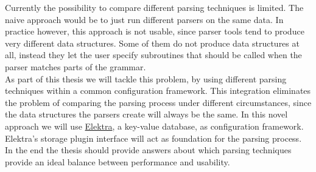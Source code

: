 \documentclass[draft, oneside, final]{vutinfth}
\begin{document}
Currently the possibility to compare different parsing techniques is limited. The naive approach would be to just run different parsers on the same data. In practice however, this approach is not usable, since parser tools tend to produce very different data structures. Some of them do not produce data structures at all, instead they let the user specify subroutines that should be called when the parser matches parts of the grammar.\\

As part of this thesis we will tackle this problem, by using different parsing techniques within a common configuration framework. This integration eliminates the problem of comparing the parsing process under different circumstances, since the data structures the parsers create will always be the same. In this novel approach we will use \href{http://web.libelektra.org}{Elektra}, a key-value database, as configuration framework. Elektra’s storage plugin interface will act as foundation for the parsing process. In the end the thesis should provide answers about which parsing techniques provide an ideal balance between performance and usability.

\backmatter


\printbibliography
\end{document}
